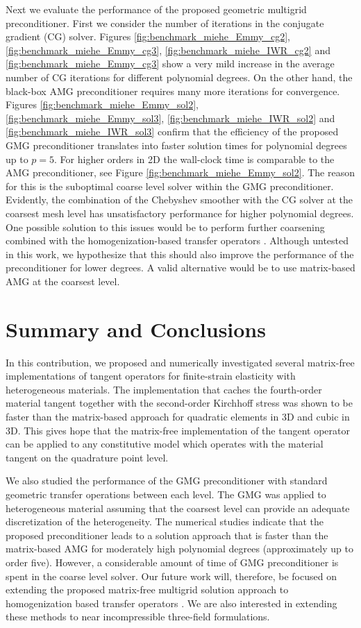 \documentclass[preprint,12pt,times]{elsarticle}
\begin{document}
Next we evaluate the performance of the proposed geometric multigrid preconditioner.
First we consider the number of iterations in the conjugate gradient (CG) solver.
Figures \ref{fig:benchmark_miehe_Emmy_cg2}, \ref{fig:benchmark_miehe_Emmy_cg3}, \ref{fig:benchmark_miehe_IWR_cg2} and \ref{fig:benchmark_miehe_Emmy_cg3} show a very mild increase in the average number of CG iterations for different polynomial degrees.
On the other hand, the black-box AMG preconditioner requires many more iterations for convergence.
Figures \ref{fig:benchmark_miehe_Emmy_sol2}, \ref{fig:benchmark_miehe_Emmy_sol3}, \ref{fig:benchmark_miehe_IWR_sol2} and \ref{fig:benchmark_miehe_IWR_sol3} confirm that the efficiency of the proposed GMG preconditioner translates into faster solution times for polynomial degrees up to $p=5$.
For higher orders in 2D the wall-clock time is comparable to the AMG preconditioner, see Figure \ref{fig:benchmark_miehe_Emmy_sol2}.
The reason for this is the suboptimal coarse level solver within the GMG preconditioner.
Evidently, the combination of the Chebyshev smoother with the CG solver at the coarsest mesh level has unsatisfactory performance for higher polynomial degrees.
One possible solution to this issues would be to perform further coarsening combined with the homogenization-based transfer operators \cite{Miehe2007}.
Although untested in this work, we hypothesize that this should also improve the performance of the preconditioner for lower degrees.
A valid alternative would be to use matrix-based AMG at the coarsest level.

\section{Summary and Conclusions}
\label{sec:summary}

In this contribution, we proposed and numerically investigated several matrix-free implementations of tangent operators for finite-strain elasticity with heterogeneous materials.
The implementation that caches the fourth-order material tangent together with the second-order Kirchhoff stress was shown to be faster than the matrix-based approach for quadratic elements in 3D and cubic in 3D.
This gives hope that the matrix-free implementation of the tangent operator can be applied to any constitutive model which operates with the material tangent on the quadrature point level.

We also studied the performance of the GMG preconditioner with standard geometric transfer operations between each level.
The GMG was applied to heterogeneous material assuming that the coarsest level can provide an adequate discretization of the heterogeneity.
The numerical studies indicate that the proposed preconditioner leads to a solution approach that is faster than the matrix-based AMG for moderately high polynomial degrees (approximately up to order five).
However, a considerable amount of time of GMG preconditioner is spent in the coarse level solver.
Our future work will, therefore, be focused on extending the proposed matrix-free multigrid solution approach to homogenization based transfer operators \cite{Miehe2007}.
We are also interested in extending these methods to near incompressible three-field formulations.
\end{document}

